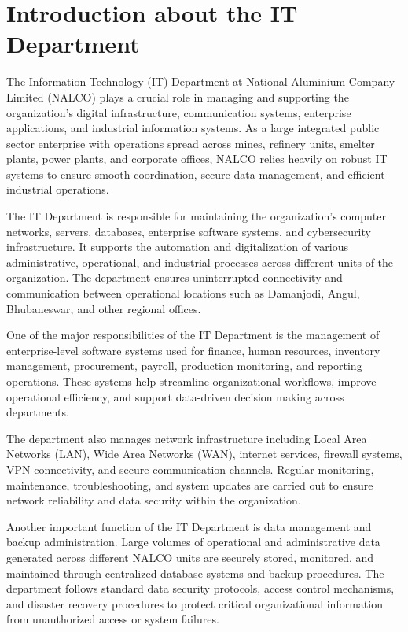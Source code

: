\chapter{Introduction about the IT Department}

The Information Technology (IT) Department at National Aluminium Company Limited (NALCO) plays a crucial role in managing and supporting the organization’s digital infrastructure, communication systems, enterprise applications, and industrial information systems. As a large integrated public sector enterprise with operations spread across mines, refinery units, smelter plants, power plants, and corporate offices, NALCO relies heavily on robust IT systems to ensure smooth coordination, secure data management, and efficient industrial operations.

The IT Department is responsible for maintaining the organization’s computer networks, servers, databases, enterprise software systems, and cybersecurity infrastructure. It supports the automation and digitalization of various administrative, operational, and industrial processes across different units of the organization. The department ensures uninterrupted connectivity and communication between operational locations such as Damanjodi, Angul, Bhubaneswar, and other regional offices.

One of the major responsibilities of the IT Department is the management of enterprise-level software systems used for finance, human resources, inventory management, procurement, payroll, production monitoring, and reporting operations. These systems help streamline organizational workflows, improve operational efficiency, and support data-driven decision making across departments.

The department also manages network infrastructure including Local Area Networks (LAN), Wide Area Networks (WAN), internet services, firewall systems, VPN connectivity, and secure communication channels. Regular monitoring, maintenance, troubleshooting, and system updates are carried out to ensure network reliability and data security within the organization.

Another important function of the IT Department is data management and backup administration. Large volumes of operational and administrative data generated across different NALCO units are securely stored, monitored, and maintained through centralized database systems and backup procedures. The department follows standard data security protocols, access control mechanisms, and disaster recovery procedures to protect critical organizational information from unauthorized access or system failures.

